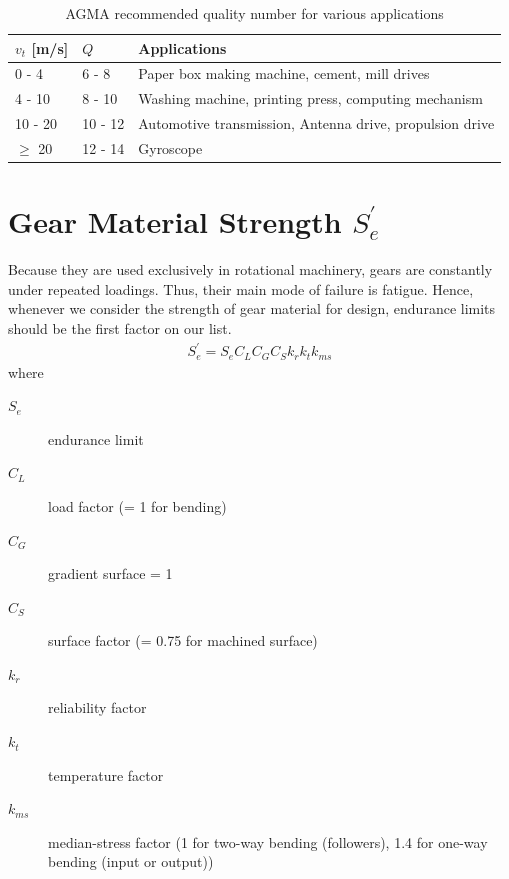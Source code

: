 \documentclass[a4paper,openany]{tufte-book}
\begin{document}
\begin{table}[htbp]
\caption{\label{tab: AGMA recommended quality}AGMA recommended quality number for various applications}
\centering
\begin{tabular}{llp{5cm}}
\toprule
\(v_{t}\) [m/s] & \(Q\) & Applications\\
\midrule
0 - 4 & 6 - 8 & Paper box making machine, cement, mill drives\\
4 - 10 & 8 - 10 & Washing machine, printing press, computing mechanism\\
10 - 20 & 10 - 12 & Automotive transmission, Antenna drive, propulsion drive\\
\(\geqslant\) 20 & 12 - 14 & Gyroscope\\
\bottomrule
\end{tabular}
\end{table}

\section{Gear Material Strength \(S_e^{\prime}\)}
\label{sec:org951538c}

Because they are used exclusively in rotational machinery, gears are constantly under repeated loadings. Thus, their main mode of failure is fatigue. Hence, whenever we consider the strength of gear material for design, endurance limits should be the first factor on our list.
\begin{align}
  S_{e}^{\prime} = S_{e}C_{L}C_{G}C_{S}k_{r}k_{t}k_{ms}
\end{align}
where

\begin{description}
\item[{\(S_{e}\)}] endurance limit

\item[{\(C_{L}\)}] load factor (= 1 for bending)

\item[{\(C_{G}\)}] gradient surface = 1

\item[{\(C_{S}\)}] surface factor (= 0.75 for machined surface)

\item[{\(k_{r}\)}] reliability factor

\item[{\(k_{t}\)}] temperature factor

\item[{\(k_{ms}\)}] median-stress factor (1 for two-way bending (followers), 1.4 for one-way bending (input or output))
\end{description}
\end{document}
